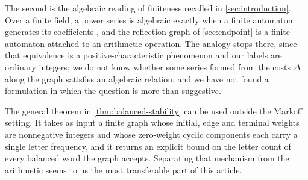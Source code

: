 The second is the algebraic reading of finiteness recalled in
\cref{sec:introduction}. Over a finite field, a power series is algebraic
exactly when a finite automaton generates its coefficients
\cite{ChristolKamaeMendesFranceRauzy1980}, and the reflection graph of
\cref{sec:endpoint} is a finite automaton attached to an arithmetic
operation. The analogy stops there, since that equivalence is a
positive-characteristic phenomenon and our labels are ordinary integers; we
do not know whether some series formed from the costs $\Delta$ along the
graph satisfies an algebraic relation, and we have not found a formulation
in which the question is more than suggestive.

The general theorem in \cref{thm:balanced-stability} can be used outside
the Markoff setting. It takes as input a finite graph whose initial, edge
and terminal weights are nonnegative integers and whose zero-weight
cyclic components each carry a single letter frequency, and it returns an
explicit bound on the letter count of every balanced word the graph
accepts. Separating that mechanism from the arithmetic seems to us the
most transferable part of this article.
